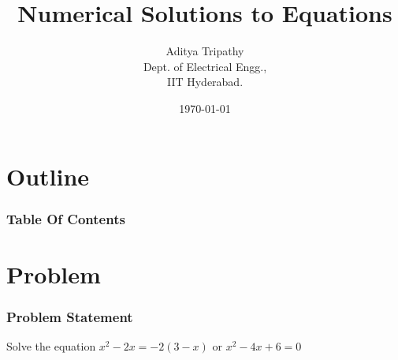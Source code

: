 \documentclass{beamer}
\title{Numerical Solutions to Equations}
\author{Aditya Tripathy\\ Dept. of Electrical Engg.,\\IIT Hyderabad.}
\date{\today}
\theoremstyle{remark}
\newcommand{\myvec}[1]{\ensuremath{\begin{pmatrix}#1\end{pmatrix}}}
\let\vec\mathbf
\numberwithin{equation}{section}
\begin{document}
\begin{frame}
\titlepage
\end{frame}

\section*{Outline}
\begin{frame}
\frametitle{Table Of Contents}
\tableofcontents
\end{frame}
\section{Problem}
\begin{frame}
\frametitle{Problem Statement}
Solve the equation 
$x^2 - 2x = -2(3 - x)$ or $x^2 - 4x + 6 = 0$
\end{frame}

\end{document}
